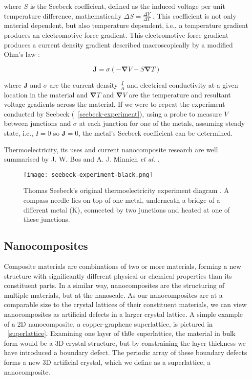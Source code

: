 \documentclass[12pt,draft]{article}
\newcommand{\figref}[2][\figurename~]{#1\ref{#2}}
\renewcommand{\vec}[1]{\mathbf{#1}}
\begin{document}
where $S$ is the Seebeck coefficient, defined as the induced voltage per unit temperature difference, mathematically $\Delta S = \frac{\Delta V}{\Delta T}$ \cite{auparay}. This coefficient is not only material dependent, but also temperature dependent, i.e., a temperature gradient produces an electromotive force gradient. This electromotive force gradient produces a current density gradient described macroscopically by a modified Ohm's law \cite{ziman}:

\begin{equation}
\label{current-density}
	\vec{J} = \sigma (-\vec{\nabla} V - S \vec{\nabla} T)
\end{equation}

where $\vec{J}$ and $\sigma$ are the current density $\frac{I}{A}$ and electrical conductivity at a given location in the material and $\vec{\nabla} T$ and $\vec{\nabla} V$ are the temperature and resultant voltage gradients across the material. If we were to repeat the experiment conducted by Seebeck (\figref{seebeck-experiment}), using a probe to measure $V$ between junctions and $\sigma$ at each junction for one of the metals, assuming steady state, i.e., $I=0$ so $\vec{J} = 0$, the metal's Seebeck coefficient can be determined.

Thermoelectricity, its uses and current nanocomposite research are well summarised by J. W. Bos \cite{bos-review} and A. J. Minnich \emph{et al.} \cite{minnich-review}.

\begin{figure}
	\centering
	\texttt{[image: seebeck-experiment-black.png]}
	\caption{Thomas Seebeck's original thermoelectricity experiment diagram \cite{seebeck-original}. A compass needle lies on top of one metal, underneath a bridge of a different metal (K), connected by two junctions and heated at one of these junctions.}
	\label{fig:seebeck-experiment}
\end{figure}

\subsection{Nanocomposites}
Composite materials are combinations of two or more materials, forming a new structure with significantly different physical or chemical properties than its constituent parts. In a similar way, nanocomposites are the structuring of multiple materials, but at the nanoscale. As our nanocomposites are at a comparable size to the crystal lattices of their constituent materials, we can view nanocomposites as artificial defects in a larger crystal lattice. A simple example of a 2D nanocomposite, a copper-graphene superlattice, is pictured in \figref{superlattice}. Examining one layer of th0e superlattice, the material in bulk form would be a 3D crystal structure, but by constraining the layer thickness we have introduced a boundary defect. The periodic array of these boundary defects forms a new 3D artificial crystal, which we define as a superlattice, a nanocomposite.
\end{document}
